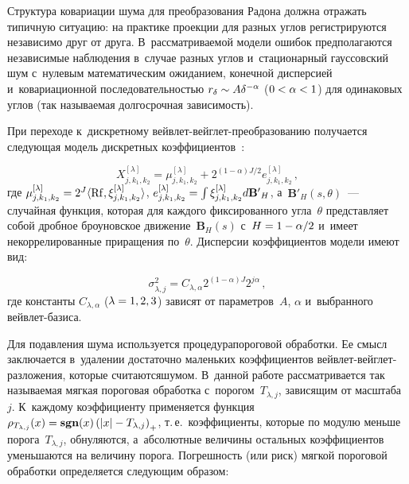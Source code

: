 \begin{multicols}{2}
Структура ковариации шума для преобразования Радона должна отражать 
типичную ситуацию: на практике проекции для разных углов регистрируются независимо 
друг от друга. В~рассмат\-ри\-ва\-емой модели ошибок предполагаются независимые наблюдения 
в~случае разных углов и~стационарный гауссовский шум с~нулевым математическим 
ожиданием, конечной дисперсией и~ковариационной последовательностью 
$r_\delta \hm\sim A \delta^{-\alpha}$ ($0\hm<\alpha\hm<1$) для одинаковых углов 
(так называемая долгосрочная зависимость).

При переходе к~дискретному вей\-влет-вейг\-лет-пре\-обра\-зо\-ва\-нию получается 
следующая модель дискретных коэффициентов~\cite{2-sh}:

\noindent
\begin{equation}
\label{WVD_Model}
X_{j,k_1,k_2}^{[\lambda]} = \mu_{j,k_1,k_2}^{[\lambda]} +  
2^{(1-\alpha)J/2} e_{j,k_1,k_2}^{[\lambda]}\,,
\end{equation}
где $\mu_{j,k_1,k_2}^{[\lambda]} \hm=  2^J\langle \mathrm{Rf}, \xi_{j,k_1,k_2}^{[\lambda]}
\rangle$, 
$e_{j,k_1,k_2}^{[\lambda]}\hm=\int\xi_{j,k_1,k_2}^{[\lambda]}d\mathbf{B'}_H$, 
а~$\mathbf{B'}_H(s,\theta)$~--- случайная функция, которая для каждого 
фиксированного угла~$\theta$ представляет собой дробное броуновское 
движение~$\mathbf{B}_H(s)$ с~$H \hm= 1\hm-\alpha/2$ и~имеет некоррелированные 
приращения по~$\theta$. Дисперсии  коэффициентов модели имеют вид:

\noindent
\begin{equation*}
\sigma_{\lambda,j}^2=C_{\lambda,\alpha} 2^{(1-\alpha)J}2^{j\alpha}\,,
\end{equation*}
где константы $C_{\lambda,\alpha}$ ($\lambda\hm=1,2,3$) зависят от пара\-мет\-ров~$A$, 
$\alpha$ и~выбранного вей\-влет-ба\-зиса.

Для подавления шума используется процедура\linebreak пороговой обработки. 
Ее смысл заключается в~удалении достаточно маленьких коэффициентов 
вей\-влет-вейг\-лет-раз\-ло\-же\-ния, которые считают\-ся\linebreak шумом. 
В~данной работе рассматривается так называемая мягкая пороговая обработка 
с~порогом~$T_{\lambda,j}$, зависящим от масштаба~$j$. К~каждому
ко\-эф\-фи\-ци\-ен\-ту применяется функция
$\rho_{T_{\lambda,j}}(x)\hm=\textbf{sgn}(x)\left(\abs{x}\hm -
T_{\lambda,j}\right)_{+}$, т.\,е.\ коэффициенты, которые по модулю 
меньше порога~$T_{\lambda,j}$,
обнуляются, а~абсолютные величины остальных коэффициентов
уменьшаются на величину порога. Погрешность (или риск) мягкой
пороговой обработки определяется следующим образом:


\end{multicols}
